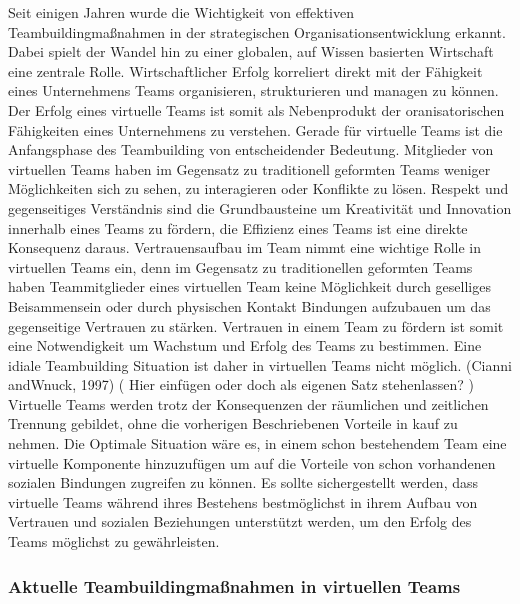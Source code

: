 \documentclass[a4paper,11pt]{article}%
\renewcommand{\\}{\vspace*{0.5\baselineskip} \newline}
\begin{document}
Seit einigen Jahren wurde die Wichtigkeit von effektiven Teambuildingmaßnahmen in der strategischen Organisationsentwicklung erkannt. Dabei spielt der Wandel hin zu einer globalen, auf Wissen basierten Wirtschaft eine zentrale Rolle. \citep{belbin2011management} \citep[p.7]{katzenbach2015wisdom}
Wirtschaftlicher Erfolg korreliert direkt mit der Fähigkeit eines Unternehmens Teams organisieren, strukturieren und managen zu können. \citep{pasmore1993designing}
Der Erfolg eines virtuelle Teams ist somit als Nebenprodukt der oranisatorischen Fähigkeiten eines Unternehmens zu verstehen. \citep[Chapter.5]{kling1994social}
	Gerade für virtuelle Teams ist die Anfangsphase des Teambuilding von entscheidender Bedeutung. Mitglieder von virtuellen Teams haben im Gegensatz zu traditionell geformten Teams weniger Möglichkeiten sich zu sehen, zu interagieren oder Konflikte zu lösen. 
Respekt und gegenseitiges Verständnis sind die Grundbausteine um Kreativität und Innovation innerhalb eines Teams zu fördern, die Effizienz eines Teams ist eine direkte Konsequenz daraus.
Vertrauensaufbau im Team nimmt eine wichtige Rolle in virtuellen Teams ein, denn im Gegensatz zu traditionellen geformten Teams haben Teammitglieder eines virtuellen Team keine Möglichkeit durch geselliges Beisammensein oder durch physischen Kontakt Bindungen aufzubauen um das gegenseitige Vertrauen zu stärken.\citep{TrustAndTheVirtualOrganisation}  \\
Vertrauen in einem Team zu fördern ist somit eine Notwendigkeit um Wachstum und Erfolg des Teams zu bestimmen. 
\citep{glacel1997teamwork} \\
Eine idiale Teambuilding Situation ist daher in virtuellen Teams nicht möglich. (Cianni andWnuck, 1997) ( Hier einfügen oder doch als eigenen Satz stehenlassen? )
Virtuelle Teams werden trotz der Konsequenzen der räumlichen und zeitlichen Trennung gebildet, ohne die vorherigen Beschriebenen Vorteile in kauf zu nehmen. Die Optimale Situation wäre es, in einem schon bestehendem Team eine virtuelle Komponente hinzuzufügen um auf die Vorteile von schon vorhandenen sozialen Bindungen zugreifen zu können. \citep[p.36-37]{holton2001building}
Es sollte sichergestellt werden, dass virtuelle Teams während ihres Bestehens bestmöglichst in ihrem Aufbau von Vertrauen und sozialen Beziehungen unterstützt werden, um den Erfolg des Teams möglichst zu gewährleisten.

	\subsubsection{Aktuelle Teambuildingmaßnahmen in virtuellen Teams}
\end{document}
